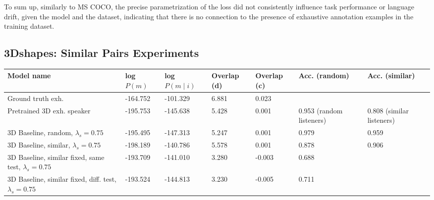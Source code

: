 To sum up, similarly to MS COCO, the precise parametrization of the loss did not consistently influence task performance or language drift, given the model and the dataset, indicating that there is no connection to the presence of exhaustive annotation examples in the training dataset.

\subsection{3Dshapes: Similar Pairs Experiments}
\label{expt:3dsapes_similar}

\begin{table}[] 
	\begin{tabularx}{\textwidth}{|X|l|l|X|X|X|X|}
		\hline
		\textbf{Model name}                                    & \textbf{log $P(m)$} & \textbf{log $P(m \mid i)$} & \textbf{Overlap (d)} & \textbf{Overlap (c)} & \textbf{Acc. (random)} & \textbf{Acc. (similar)} \\ \hline
		Ground truth exh.       &      -164.752            &         -101.329               &       6.881             &      0.023               &                 &                \\ \hline
		Pretrained 3D exh. speaker                            &       -195.753            &         -145.638               &        5.428              &      0.001                & 0.953 (random listeners)                 & 0.808 (similar listeners)                 \\ \hline
		3D Baseline, random, $\lambda_s = 0.75$  &       -195.495        &           -147.313           &          5.247            &         0.001             & 0.979                                    &                        0.959                   \\ \hline
		3D Baseline, similar, $\lambda_s = 0.75$ &      -198.189             &       -140.786                 &           5.578           &        0.001              & 0.878                      &            0.906                        \\ \hline
		3D Baseline, similar fixed, same test, $\lambda_s = 0.75$ &       -193.709            &    -141.010                  &        3.280            &      -0.003         &            0.688       &                              \\ \hline
		3D Baseline, similar fixed, diff. test, $\lambda_s = 0.75$ &      -193.524             &          -144.813            &       3.230             &     -0.005          &     0.711              &                              \\ \hline

\end{tabularx}
\end{table}
